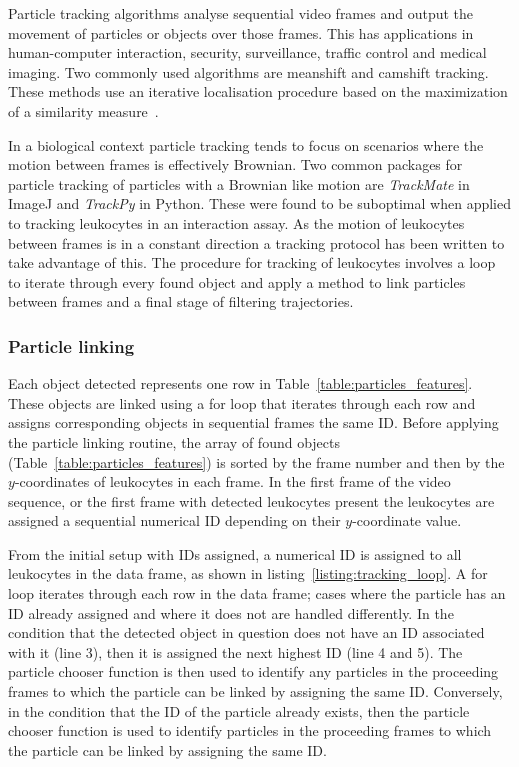 Particle tracking algorithms analyse sequential video frames and output the movement of particles or objects over those frames. This has applications in human-computer interaction, security, surveillance, traffic control and medical imaging. Two commonly used algorithms are meanshift and camshift tracking. These methods use an iterative localisation procedure based on the maximization of a similarity measure~\cite{Comaniciu2000}.

In a biological context particle tracking tends to focus on scenarios where the motion between frames is effectively Brownian. Two common packages for particle tracking of particles with a Brownian like motion are \emph{TrackMate} in ImageJ and \emph{TrackPy} in Python. These were found to be suboptimal when applied to tracking leukocytes in an interaction assay. As the motion of leukocytes between frames is in a constant direction a tracking protocol has been written to take advantage of this. The procedure for tracking of leukocytes involves a loop to iterate through every found object and apply a method to link particles between frames and a final stage of filtering trajectories.

\subsubsection{Particle linking}
Each object detected represents one row in Table~\ref{table:particles_features}. These objects are linked using a for loop that iterates through each row and assigns corresponding objects in sequential frames the same ID. Before applying the particle linking routine, the array of found objects (Table~\ref{table:particles_features}) is sorted by the frame number and then by the $y$-coordinates of leukocytes in each frame. In the first frame of the video sequence, or the first frame with detected leukocytes present the leukocytes are assigned a sequential numerical ID depending on their $y$-coordinate value.

From the initial setup with IDs assigned, a numerical ID is assigned to all leukocytes in the data frame, as shown in listing~\ref{listing:tracking_loop}. A for loop iterates through each row in the data frame; cases where the particle has an ID already assigned and where it does not are handled differently. In the condition that the detected object in question does not have an ID associated with it (line 3), then it is assigned the next highest ID (line 4 and 5). The particle chooser function is then used to identify any particles in the proceeding frames to which the particle can be linked by assigning the same ID. Conversely, in the condition that the ID of the particle already exists, then the particle chooser function is used to identify particles in the proceeding frames to which the particle can be linked by assigning the same ID.


